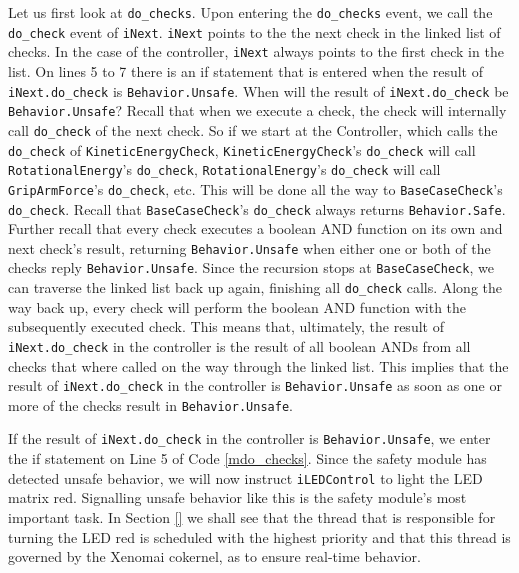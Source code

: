\documentclass[12pt]{scrreprt}
\begin{document}
Let us first look at \texttt{do\_checks}. Upon entering the \texttt{do\_checks} event, we call the \texttt{do\_check} event of \texttt{iNext}. \texttt{iNext} points to the the next check in the linked list of checks. In the case of the controller, \texttt{iNext} always points to the first check in the list. On lines 5 to 7 there is an if statement that is entered when the result of \texttt{iNext.do\_check} is \texttt{Behavior.Unsafe}. When will the result of \texttt{iNext.do\_check} be \texttt{Behavior.Unsafe}? Recall that when we execute a check, the check will internally call \texttt{do\_check} of the next check. So if we start at the Controller, which calls the \texttt{do\_check} of \texttt{KineticEnergyCheck}, \texttt{KineticEnergyCheck}'s \texttt{do\_check} will call \texttt{RotationalEnergy}'s \texttt{do\_check}, \texttt{RotationalEnergy}'s \texttt{do\_check} will call \texttt{GripArmForce}'s \texttt{do\_check}, etc. This will be done all the way to \texttt{BaseCaseCheck}'s \texttt{do\_check}. Recall that \texttt{BaseCaseCheck}'s \texttt{do\_check} always returns \texttt{Behavior.Safe}. Further recall that every check executes a boolean AND function on its own and next check's result, returning \texttt{Behavior.Unsafe} when either one or both of the checks reply \texttt{Behavior.Unsafe}. Since the recursion stops at \texttt{BaseCaseCheck}, we can traverse the linked list back up again, finishing all \texttt{do\_check} calls. Along the way back up, every check will perform the boolean AND function with the subsequently executed check. This means that, ultimately, the result of \texttt{iNext.do\_check} in the controller is the result of all boolean ANDs from all checks that where called on the way through the linked list. This implies that the result of \texttt{iNext.do\_check} in the controller is \texttt{Behavior.Unsafe} as soon as one or more of the checks result in \texttt{Behavior.Unsafe}.
\par
If the result of \texttt{iNext.do\_check} in the controller is \texttt{Behavior.Unsafe}, we enter the if statement on Line 5 of Code \ref{mdo_checks}. Since the safety module has detected unsafe behavior, we will now instruct \texttt{iLEDControl} to light the LED matrix red. Signalling unsafe behavior like this is the safety module's most important task. In Section \ref{} we shall see that the thread that is responsible for turning the LED red is scheduled with the highest priority and that this thread is governed by the Xenomai cokernel, as to ensure real-time behavior.
\par
\end{document}
